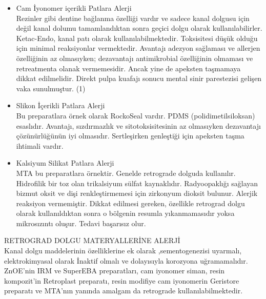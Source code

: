 \begin{itemize}
\item Cam İyonomer içerikli Patlara Alerji\\
Rezinler gibi dentine bağlanma özelliği vardır ve sadece kanal dolgusu için değil kanal dolumu tamamlandıktan sonra geçici dolgu olarak kullanılabilirler. Ketac-Endo, kanal patı olarak kullanılabilmektedir. Toksisitesi düşük olduğu için minimal reaksiyonlar vermektedir. Avantajı adezyon sağlaması ve allerjen özelliğinin az olmasıyken; dezavantajı antimikrobial özelliğinin olmaması ve retreatmenta olanak vermemesidir. Ancak yine de apeksten taşmamaya dikkat edilmelidir. Direkt pulpa kuafajı sonucu mental sinir parestezisi gelişen vaka sunulmuştur. (1)

\item Slikon İçerikli Patlara Alerji\\
Bu preparatlara örnek olarak RockoSeal vardır. PDMS (polidimetilsiloksan) esaslıdır. Avantajı, sızdırmazlık ve sitotoksisitesinin az olmasıyken dezavantajı çözünürlüğünün iyi olmasıdır. Sertleşirken genleştiği için apeksten taşma ihtimali vardır. 

\item Kalsiyum Silikat Patlara Alerji\\
MTA bu preparatlara örnektir. Genelde retrograde dolguda kullanılır. Hidrofilik bir toz olan trikalsiyum sülfat kaynaklıdır. Radyoopaklığı sağlayan bizmut oksit ve  dişi renkleştirmemesi için zirkonyum dioksit bulunur. Alerjik reaksiyon vermemiştir. Dikkat edilmesi gereken, özellikle retrograd dolgu olarak kullanıldıktan sonra o bölgenin resumla yıkanmamasıdır yoksa mikrosızıntı oluşur. Tedavi başarısız olur. 
   
\end{itemize}

RETROGRAD DOLGU MATERYALLERİNE ALERJİ \\
Kanal dolgu maddelerinin özelliklerine ek olarak ,sementogenezisi uyarmalı, elektrokimyasal olarak İnaktif olmalı ve dolayısıyla korozyona uğramamalıdır. ZnOE’nin IRM ve SuperEBA preparatları, cam iyonomer siman, resin kompozit’in Retroplast preparatı, resin modifiye cam iyonomerin Geristore preparatı ve MTA’nın yanında amalgam da retrograde kullanılabilmektedir.

